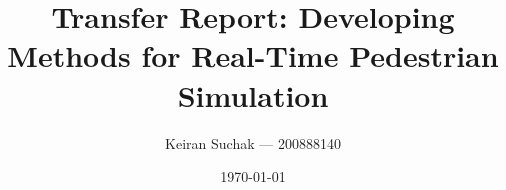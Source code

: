 \documentclass[a4paper, 11pt]{article}
\begin{document}
\title{Transfer Report: Developing Methods for Real-Time Pedestrian Simulation}
\author{Keiran Suchak --- 200888140}
\date{\today}
\maketitle

\tableofcontents

\newpage




















%

%



\end{document}
